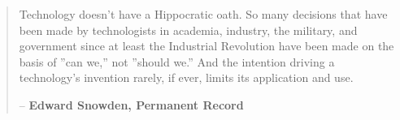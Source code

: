 \documentclass[10pt]{beamer}
\begin{document}
% 
% 
% 
% 
% 
% 
% 
% 
% 
% 
% 

\begin{frame}
  \begin{quote}
    Technology doesn't have a Hippocratic oath. So many decisions that have been made by technologists in academia, industry, the military, and government since at least the Industrial Revolution have been made on the basis of ''can we,'' not ''should we.'' And the intention driving a technology's invention rarely, if ever, limits its application and use. \\ \begin{center} -- \textbf{Edward Snowden, Permanent Record}\cite{PermanentRecord} \end{center}
  \end{quote}
\end{frame}
\end{document}
